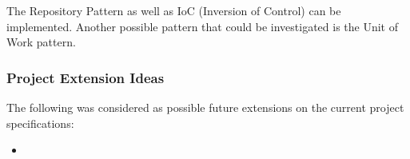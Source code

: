 The Repository Pattern as well as IoC (Inversion of Control) can be implemented. Another possible pattern that could be investigated is the Unit of Work pattern.

	
\subsubsection{Project Extension Ideas}
The following was considered as possible future extensions on the current project specifications:

\begin{itemize}
	\item{}
\end{itemize}
